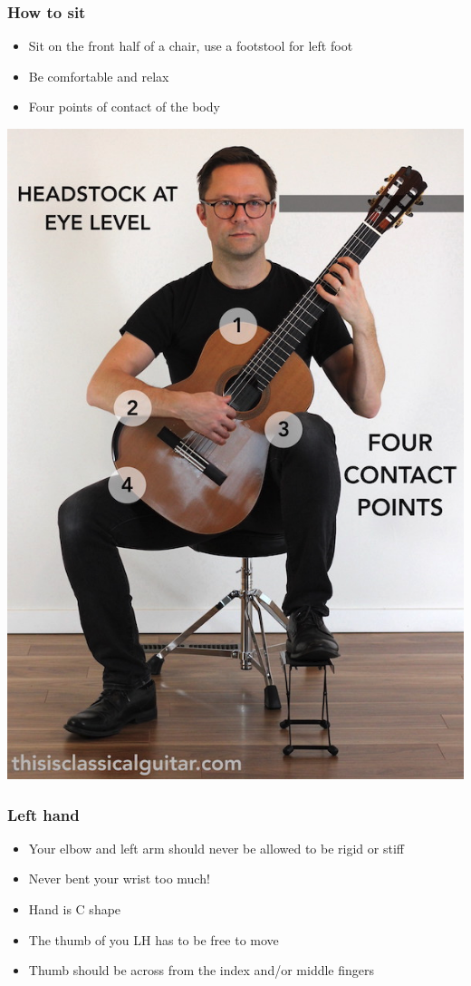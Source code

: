 \documentclass[11pt]{article}
\begin{document}
\subsubsection*{How to sit}
\label{sec:org951b376}
\begin{itemize}
\item Sit on the front half of a chair, use a footstool for left foot
\item Be comfortable and relax
\item Four points of contact of the body
\end{itemize}
\begin{center}
\includegraphics[width=.9\linewidth]{./Handouts.org_20240214_210131.png}
\end{center}
\subsubsection*{Left hand}
\label{sec:org6c26be6}
\begin{itemize}
\item Your elbow and left arm should never be allowed to be rigid or stiff
\item Never bent your wrist too much!
\item Hand is C shape
\item The thumb of you LH has to be free to move
\item Thumb should be across from the index and/or middle fingers
\end{itemize}
\end{document}
